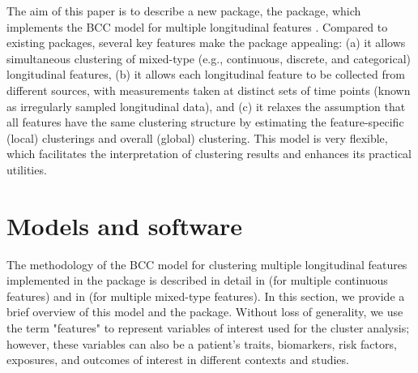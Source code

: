 The aim of this paper is to describe a new package, the  package, which implements the BCC model for multiple longitudinal features \citep{Lu2022,Tan2022a}. Compared to existing packages, several key features make the  package appealing: (a) it allows simultaneous clustering of mixed-type (e.g., continuous, discrete, and categorical) longitudinal features, (b) it allows each longitudinal feature to be collected from different sources, with measurements taken at distinct sets of time points (known as irregularly sampled longitudinal data), and (c) it relaxes the assumption that all features have the same clustering structure by estimating the feature-specific (local) clusterings and overall (global) clustering. This model is very flexible, which facilitates the interpretation of clustering results and enhances its practical utilities. 
\section{Models and software} \label{sec:models}
The methodology of the BCC model for clustering multiple longitudinal features implemented in the  package is described in detail in \citet{Lu2022} (for multiple continuous features) and in \citet{Tan2022a} (for multiple mixed-type features). In this section, we provide a brief overview of this model and the  package. Without loss of generality, we use the term "features" to represent variables of interest used for the cluster analysis; however, these variables can also be a patient's traits, biomarkers, risk factors, exposures, and outcomes of interest in different contexts and studies.
